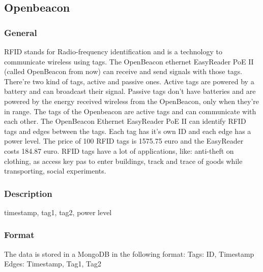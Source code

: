 	\subsection{Openbeacon}
		\subsubsection{General}
			RFID stands for Radio-frequency identification and is a technology to communicate wireless using tags. The OpenBeacon ethernet EasyReader PoE II (called OpenBeacon from now) can receive and send signals with those tags. There're two kind of tags, active and passive ones. Active tags are powered by a battery and can broadcast their signal. Passive tags don't have batteries and are powered by the energy received wireless from the OpenBeacon, only when they're in range. The tags of the Openbeacon are active tags and can communicate with each other. The OpenBeacon Ethernet EasyReader PoE II can identify RFID tags and edges between the tags. Each tag has it's own ID and each edge has a power level. The price of 100 RFID tags is 1575.75 euro and the EasyReader costs 184.87 euro. RFID tags have a lot of applications, like: anti-theft on clothing, as access key pas to enter buildings, track and trace of goods while transporting, social experiments.
		\subsubsection{Description}
		timestamp, tag1, tag2, power level

		\subsubsection{Format}
		The data is stored in a MongoDB in the following format:
		Tags: ID, Timestamp
		Edges: Timestamp, Tag1, Tag2
